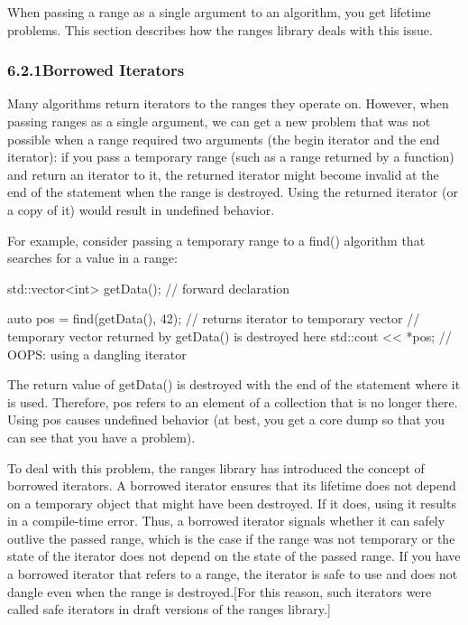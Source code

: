 

When passing a range as a single argument to an algorithm, you get lifetime problems. This section describes how the ranges library deals with this issue.

\subsubsection*{ 6.2.1\hspace{0.2cm}Borrowed Iterators}

Many algorithms return iterators to the ranges they operate on. However, when passing ranges as a single argument, we can get a new problem that was not possible when a range required two arguments (the begin iterator and the end iterator): if you pass a temporary range (such as a range returned by a function) and return an iterator to it, the returned iterator might become invalid at the end of the statement when the range is destroyed. Using the returned iterator (or a copy of it) would result in undefined behavior.

For example, consider passing a temporary range to a find() algorithm that searches for a value in a range:

\begin{cpp}
std::vector<int> getData(); // forward declaration

auto pos = find(getData(), 42); // returns iterator to temporary vector
// temporary vector returned by getData() is destroyed here
std::cout << *pos; // OOPS: using a dangling iterator
\end{cpp}

The return value of getData() is destroyed with the end of the statement where it is used. Therefore, pos refers to an element of a collection that is no longer there. Using pos causes undefined behavior (at best, you get a core dump so that you can see that you have a problem).

To deal with this problem, the ranges library has introduced the concept of borrowed iterators. A borrowed iterator ensures that its lifetime does not depend on a temporary object that might have been destroyed. If it does, using it results in a compile-time error. Thus, a borrowed iterator signals whether it can safely outlive the passed range, which is the case if the range was not temporary or the state of the iterator does not depend on the state of the passed range. If you have a borrowed iterator that refers to a range, the iterator is safe to use and does not dangle even when the range is destroyed.[For this reason, such iterators were called safe iterators in draft versions of the ranges library.] 

